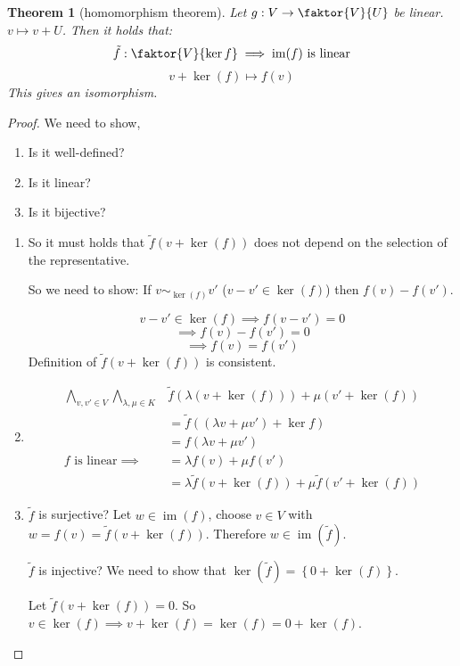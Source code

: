 \documentclass[a4paper,landscape,twocolumn]{article}
\newcommand\set[1]{\left\{#1\right\}}
\newtheorem{theorem}{Theorem}[section]
\DeclareMathOperator\image{im} %
\DeclareMathOperator\kernel{ker} %
\begin{document}
\begin{theorem}[homomorphism theorem] %
  \label{satz-5-21}
  Let $g: V \rightarrow \faktor{V}{U}$ be linear. $v \mapsto v + U$.
  Then it holds that:
  \[ \tilde{f}: \faktor{V}{\kernel{f}} \implies \image(f) \text{ is linear} \]
  \[ v + \kernel(f) \mapsto f(v) \]
  This gives an isomorphism.
\end{theorem}
\begin{proof}
  We need to show,
  \begin{enumerate}
    \item Is it well-defined?
    \item Is it linear?
    \item Is it bijective?
  \end{enumerate}

  \begin{enumerate}
    \item
      So it must holds that $\tilde{f}(v + \kernel(f))$ does not depend on the selection of the representative.

      So we need to show:
      If $v \sim_{\kernel(f)} v'$ ($v - v' \in \kernel(f)$) then $f(v) - f(v')$.

      \[ v - v' \in \kernel(f) \implies f(v - v') = 0 \]
      \[ \implies f(v) - f(v') = 0 \]
      \[ \implies f(v) = f(v') \]
      Definition of $\tilde{f}(v + \kernel(f))$ is consistent.
    \item
      \begin{align*}
        \bigwedge_{v,v' \in V} \bigwedge_{\lambda,\mu \in K} &
        \tilde{f}(\lambda(v + \kernel(f))) + \mu(v' + \kernel(f)) \\
        &= \tilde{f}((\lambda v + \mu v') + \kernel{f}) \\
        &= f(\lambda v + \mu v') \\
      \text{$f$ is linear} \implies
        &= \lambda f(v) + \mu f(v') \\
        &= \lambda \tilde{f}(v + \kernel(f)) + \mu \tilde{f}(v' + \kernel(f))
      \end{align*}
    \item
      $\tilde{f}$ is surjective?
      Let $w \in \image(f)$, choose $v \in V$ with $w = f(v) = \tilde{f}(v + \kernel(f))$.
      Therefore $w \in \image(\tilde{f})$.

      $\tilde{f}$ is injective?
      We need to show that $\kernel(\tilde{f}) = \set{0 + \kernel(f)}$.

      Let $\tilde{f}(v + \kernel(f)) = 0$.
      So $v \in \kernel(f) \implies v + \kernel(f) = \kernel(f) = 0 + \kernel(f)$.
  \end{enumerate}
\end{proof}
\end{document}
